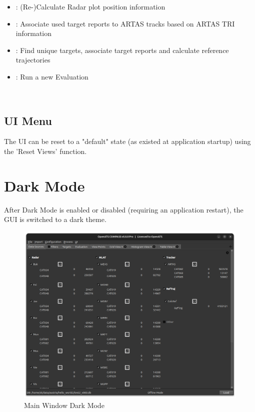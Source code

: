 \begin{itemize}
 \item {}: (Re-)Calculate Radar plot position information
 \item {}: Associate used target reports to ARTAS tracks based on ARTAS TRI information
 \item {}: Find unique targets, associate target reports and calculate reference trajectories
 \item {}: Run a new Evaluation
\end{itemize}
\  \\

\subsection{UI Menu}
\label{sec:ui_overview_ui_menu}

The UI can be reset to a "default" state (as existed at application startup) using the 'Reset Views' function.







\section{Dark Mode}
\label{sec:ui_overview_dark_mode}

After Dark Mode is enabled or disabled (requiring an application restart), the GUI is switched to a dark theme.

\begin{figure}[H]
  \hspace*{-2.5cm}
    \includegraphics[width=19cm]{figures/dark_mode.png}
  \caption{Main Window Dark Mode}
\end{figure}

